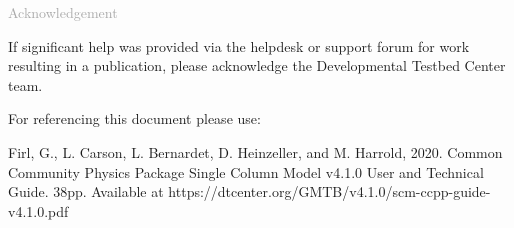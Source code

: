\begin{titlepage}
\vspace*{0.5cm}
\noindent

\begin{flushleft}
\textcolor{darkgray}{\LARGE Acknowledgement}
\vspace*{1cm}\par

If significant help was provided via the helpdesk or support forum for work resulting in a publication, please acknowledge the Developmental Testbed Center team.\\
\vspace*{1cm}\par
For referencing this document please use:\\
\vspace*{1cm}\par
Firl, G., L. Carson, L. Bernardet, D. Heinzeller, and M. Harrold, 2020. Common Community Physics Package Single Column Model v4.1.0 User and Technical Guide. 38pp. Available at https://dtcenter.org/GMTB/v4.1.0/scm-ccpp-guide-v4.1.0.pdf

\end{flushleft}
\end{titlepage}
\pagebreak{}
